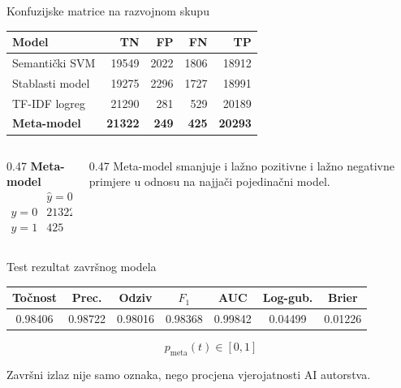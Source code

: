 \documentclass[aspectratio=169]{beamer}
\begin{document}
\begin{frame}{Konfuzijske matrice na razvojnom skupu}
    \centering
    \scriptsize
    \begin{tabular}{@{}lrrrr@{}}
        \toprule
        \textbf{Model} & \textbf{TN} & \textbf{FP} & \textbf{FN} & \textbf{TP} \\ \midrule
        Semantički SVM & 19549 & 2022 & 1806 & 18912 \\
        Stablasti model & 19275 & 2296 & 1727 & 18991 \\
        TF-IDF logreg & 21290 & 281 & 529 & 20189 \\
        \textbf{Meta-model} & \textbf{21322} & \textbf{249} & \textbf{425} & \textbf{20293} \\ \bottomrule
    \end{tabular}

    \vspace{5mm}
    \begin{columns}[T]
        \begin{column}{0.47\textwidth}
            \centering
            \textbf{Meta-model}
            \[
            \begin{array}{c|cc}
             & \hat y=0 & \hat y=1 \\
            \hline
            y=0 & 21322 & 249 \\
            y=1 & 425 & 20293
            \end{array}
            \]
        \end{column}
        \begin{column}{0.47\textwidth}
            \small
            Meta-model smanjuje i lažno pozitivne i lažno negativne primjere u odnosu na najjači pojedinačni model.
        \end{column}
    \end{columns}
\end{frame}

\begin{frame}{Test rezultat završnog modela}
    \centering
    \begin{tabular}{@{}ccccccc@{}}
        \toprule
        \textbf{Točnost} & \textbf{Prec.} & \textbf{Odziv} & \textbf{$F_1$} & \textbf{AUC} & \textbf{Log-gub.} & \textbf{Brier} \\ \midrule
        0.98406 & 0.98722 & 0.98016 & 0.98368 & 0.99842 & 0.04499 & 0.01226 \\ \bottomrule
    \end{tabular}

    \vspace{7mm}
    \Large
    \[
        p_{\mathrm{meta}}(t) \in [0,1]
    \]

    \normalsize
    Završni izlaz nije samo oznaka, nego procjena vjerojatnosti AI autorstva.
\end{frame}
\end{document}

